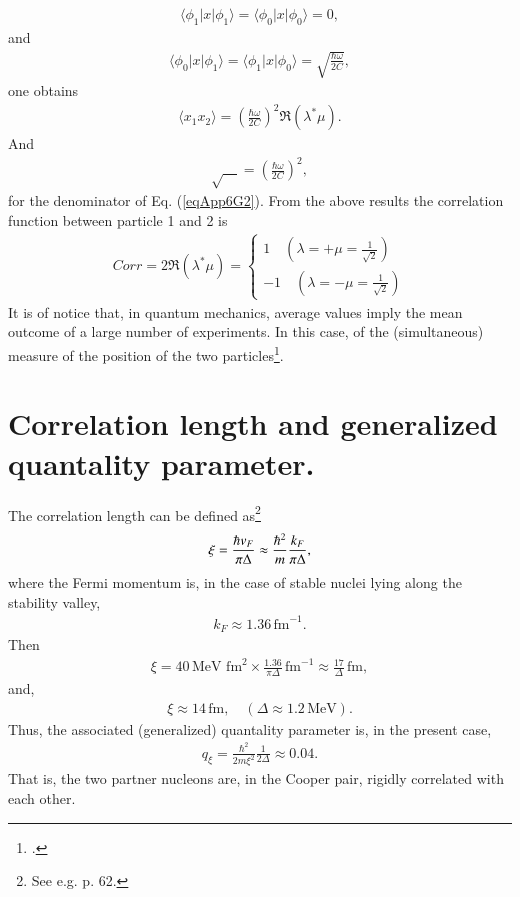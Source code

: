 \begin{subappendices}
\begin{align}\label{eqApp6G4}
\langle\phi_1|x|\phi_1\rangle=\langle\phi_0|x|\phi_0\rangle=0,
\end{align} 
and
\begin{align}\label{eqApp6G5}
\langle\phi_0|x|\phi_1\rangle=\langle\phi_1|x|\phi_0\rangle=\sqrt{\frac{\hbar\omega}{2C}},
\end{align}
one obtains
\begin{align}\label{eqApp6G6}
\langle x_1x_2\rangle=\left(\frac{\hbar\omega}{2C}\right)^2\Re(\lambda^*\mu).
\end{align} 
And 
\begin{align}\label{eqApp6G7}
\sqrt{\quad}=\left(\frac{\hbar\omega}{2C}\right)^2,
\end{align}
for the denominator of Eq. (\ref{eqApp6G2}).
From the above results the correlation function between particle 1 and 2 is
\begin{align}\label{eqApp6G8}
Corr=2\Re(\lambda^*\mu)=
\left\{
\begin{array}{c}
 1\quad (\lambda=+\mu=\frac{1}{\sqrt{2}})\\ 
 -1 \quad (\lambda=-\mu=\frac{1}{\sqrt{2}})
\end{array}
\right. 
\end{align}
It is of notice that, in quantum mechanics, average values imply the mean outcome of a large number of experiments. In this case, of the (simultaneous) measure of the position of the two particles\footnote{\cite{Basdevant:05}.}.





\section[Correlation length]{Correlation length and generalized quantality parameter.}\label{App6H}
The correlation length can be defined as\footnote{See e.g. \cite{Annett:13} p. 62.}
\begin{align}\label{eqApp6H1}
\xi=\frac{\hbar v_F}{\pi\Delta}\approx\frac{\hbar^2}{m}\frac{k_F}{\pi\Delta},\idx{Cooper pair!--mean square radius (correlation length)}
\end{align}
where the Fermi momentum is, in the case of stable nuclei lying along the stability valley,
\begin{align}\label{eqApp6H2}
k_F\approx 1.36\,\text{fm}^{-1}.
\end{align}
Then
\begin{align}\label{eqApp6H3} 	
\xi=40\,\text{MeV fm}^2\times \frac{1.36}{\pi\Delta}\,\text{fm}^{-1}\approx \frac{17}{\Delta}\,\text{fm},
\end{align}
and,
\begin{align}\label{eqApp6H4}
\xi\approx 14\,\text{fm},\quad (\Delta\approx1.2\,\text{MeV}).
\end{align}
Thus, the associated (generalized) quantality parameter is, in the present case,
\begin{align}\label{eqApp6H8}
q_\xi=\frac{\hbar^2}{2m\xi^2}\frac{1}{2\Delta}\approx0.04.
\end{align} 
That is, the two partner nucleons are, in the Cooper pair, rigidly correlated with each other.



\end{subappendices}
